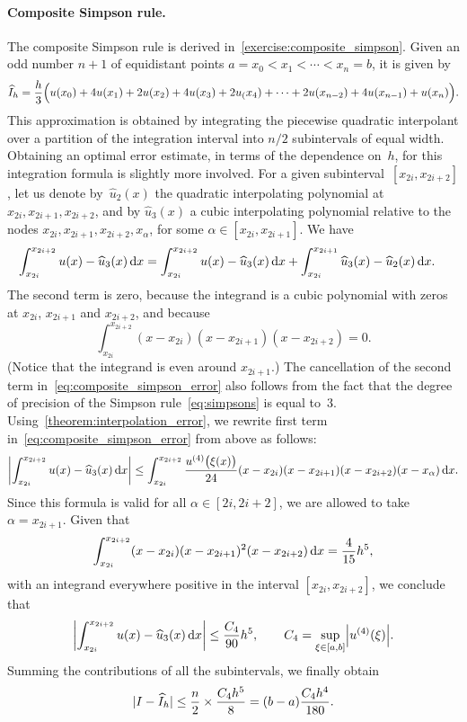 \paragraph{Composite Simpson rule.}
The composite Simpson rule is derived in~\cref{exercise:composite_simpson}.
Given an odd number $n+1$ of equidistant points $a = x_0 < x_1 < \dotsb < x_n = b$,
it is given by
\begin{equation}
    \label{eq:composite_simpson}
    \widehat I_h = \frac{h}{3} \Bigl( u(x_0) + 4 u(x_1) + 2 u(x_2) + 4 u(x_3) + 2 u_(x_4) + \dotsb + 2 u(x_{n-2}) + 4 u(x_{n-1}) + u(x_n)\Bigr).
\end{equation}
This approximation is obtained by integrating the piecewise quadratic interpolant
over a partition of the integration interval into $n/2$ subintervals of equal width.
Obtaining an optimal error estimate,
in terms of the dependence on~$h$,
for this integration formula is slightly more involved.
For a given subinterval~$[x_{2i}, x_{2i+2}]$,
let us denote by~$\widehat u_2(x)$ the quadratic interpolating polynomial at $x_{2i}, x_{2i+1}, x_{2i+2}$,
and by $\widehat u_3(x)$ a cubic interpolating polynomial relative to the nodes $x_{2i}, x_{2i+1}, x_{2i+2}, x_{\alpha}$,
for some $\alpha \in [x_{2i}, x_{2i+1}]$.
We have
\begin{align}
    \label{eq:composite_simpson_error}
    \int_{x_{2i}}^{x_{2i+2}} u(x) - \widehat u_3(x) \, \d x
    &= \int_{x_{2i}}^{x_{2i+2}} u(x) - \widehat u_3(x)  \, \d x + \int_{x_{2i}}^{x_{2i+1}} \widehat u_3(x) - \widehat u_2(x)  \, \d x.
\end{align}
The second term is zero,
because the integrand is a cubic polynomial with zeros at $x_{2i}$, $x_{2i+1}$ and $x_{2i+2}$,
and because
\[
    \int_{x_{2i}}^{x_{2i+2}} (x - x_{2i}) (x - x_{2i+1}) (x - x_{2i+2}) = 0.
\]
(Notice that the integrand is even around $x_{2i+1}$.)
The cancellation of the second term in~\eqref{eq:composite_simpson_error} also follows from the fact that
the degree of precision of the Simpson rule~\eqref{eq:simpsons} is equal to~3.
Using~\cref{theorem:interpolation_error},
we rewrite first term in~\eqref{eq:composite_simpson_error} from above as follows:
\[
    \abs*{\int_{x_{2i}}^{x_{2i+2}} u(x) - \widehat u_3(x)  \, \d x}
    \leq \int_{x_{2i}}^{x_{2i+2}} \frac{u^{(4)} \bigl(\xi(x)\bigr)}{24} (x-x_{2i})(x- x_{2i+1}) (x-x_{2i+2}) (x - x_{\alpha})\, \d x.
\]
Since this formula is valid for all $\alpha \in [2i, 2i+2]$,
we are allowed to take $\alpha = x_{2i+1}$.
Given that
\[
    \int_{x_{2i}}^{x_{2i+2}} (x-x_{2i})(x- x_{2i+1})^2 (x-x_{2i+2}) \, \d x = \frac{4}{15} h^5,
\]
with an integrand everywhere positive in the interval $[x_{2i}, x_{2i+2}]$,
we conclude that
\[
    \abs*{\int_{x_{2i}}^{x_{2i+2}} u(x) - \widehat u_3(x)  \, \d x} \leq \frac{C_4}{90} h^5,
    \qquad C_4 = \sup_{\xi \in [a, b]} \abs*{u^{(4)}(\xi)}.
\]
Summing the contributions of all the subintervals,
we finally obtain
\begin{equation}
    \abs{I - \widehat I_h} \leq  \frac{n}{2} \times \frac{C_4 h^5}{8} = (b-a)\frac{C_4 h^4}{180}.
\end{equation}

